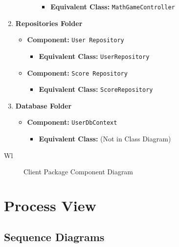\documentclass[11pt,a4paper]{article}
\newcommand{\inputdiagram}[1]{}
\newcommand{\textwidthdiagram}[2][1]{%
  \resizebox{#1\textwidth}{!}{\inputdiagram{#2}}%
}
\begin{document}
\begin{enumerate}[label=\textbf{\arabic*.}, ref=\arabic*]
\begin{enumerate}[label=\textbf{\alph*.}, ref=\theenumi.\alph*]
\begin{itemize}
                        \begin{itemize}
                            \item \textbf{Equivalent Class:} \texttt{MathGameController}
                        \end{itemize}
                \end{itemize}
        \end{enumerate}
    \item \textbf{Repositories Folder}
        \begin{itemize}
            \item \textbf{Component:} \texttt{User Repository}
                \begin{itemize}
                    \item \textbf{Equivalent Class:} \texttt{UserRepository}
                \end{itemize}
            \item \textbf{Component:} \texttt{Score Repository}
                \begin{itemize}
                    \item \textbf{Equivalent Class:} \texttt{ScoreRepository}
                \end{itemize}
        \end{itemize}
    \item \textbf{Database Folder}
        \begin{itemize}
            \item \textbf{Component:} \texttt{UserDbContext}
                \begin{itemize}
                    \item \textbf{Equivalent Class:} (Not in Class Diagram)
                \end{itemize}
        \end{itemize}
\end{enumerate}


Wl


\begin{figure}[H]
    \centering
    \textwidthdiagram{client_components.tex}
    \caption{Client Package Component Diagram}
    \label{fig:client_components}
\end{figure}

\section{Process View}

\subsection{Sequence Diagrams}
\end{document}

